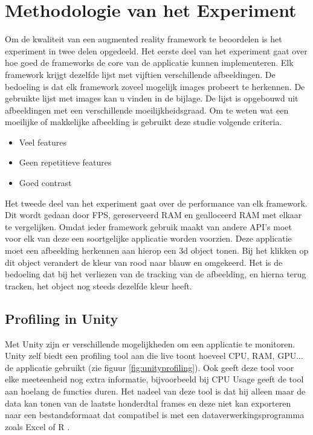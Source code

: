 
\chapter{Methodologie van het Experiment}
\label{ch:methodologie}

Om de kwaliteit van een augmented reality framework te beoordelen is het experiment in twee delen opgedeeld. Het eerste deel van het experiment gaat over hoe goed de frameworks de core van de applicatie kunnen implementeren. Elk framework krijgt dezelfde lijst met vijftien verschillende afbeeldingen. De bedoeling is dat elk framework zoveel mogelijk images probeert te herkennen. De gebruikte lijst met images kan u vinden in de bijlage. De lijst is opgebouwd uit afbeeldingen met een verschillende moeilijkheidsgraad. Om te weten wat een moeilijke of makkelijke afbeelding is gebruikt deze studie volgende criteria.

\begin{itemize}
    \item Veel features
    \item Geen repetitieve features
    \item Goed contrast
\end{itemize} 


Het tweede deel van het experiment gaat over de performance van elk framework. Dit wordt gedaan door FPS, gereserveerd RAM en gealloceerd RAM met elkaar te vergelijken. Omdat ieder framework gebruik maakt van andere API's moet voor elk van deze een soortgelijke applicatie worden voorzien. Deze applicatie moet een afbeelding herkennen aan hierop een 3d object tonen. Bij het klikken op dit object verandert de kleur van rood naar blauw en omgekeerd. Het is de bedoeling dat bij het verliezen van de tracking van de afbeelding, en hierna terug tracken, het object nog steeds dezelfde kleur heeft.

\section{Profiling in Unity}
Met Unity zijn er verschillende mogelijkheden om een applicatie te monitoren. Unity zelf biedt een profiling tool aan die live toont hoeveel CPU, RAM, GPU... de applicatie gebruikt (zie figuur \ref{fig:unityprofiling}). Ook geeft deze tool voor elke meeteenheid nog extra informatie, bijvoorbeeld bij CPU Usage geeft de tool aan hoelang de functies duren. Het nadeel van deze tool is dat hij alleen maar de data kan tonen van de laatste honderdtal frames en deze niet kan exporteren naar een bestandsformaat dat compatibel is met een dataverwerkingsprogramma zoals Excel of R \autocite{UnityProfiling}.

